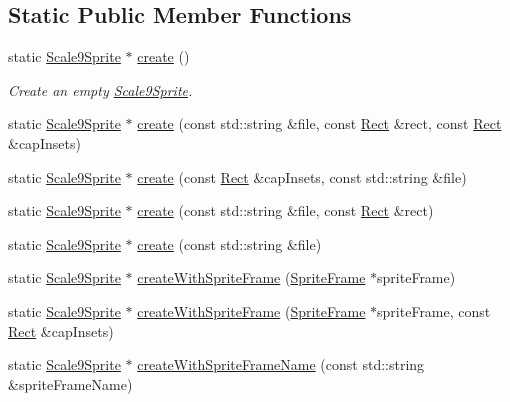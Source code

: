 \subsection*{Static Public Member Functions}
\begin{DoxyCompactItemize}
\item 
static \hyperlink{classui_1_1Scale9Sprite}{Scale9\+Sprite} $\ast$ \hyperlink{classui_1_1Scale9Sprite_abb087d61e6281ca484774a3dfc06d796}{create} ()
\begin{DoxyCompactList}\small\item\em Create an empty \hyperlink{classui_1_1Scale9Sprite}{Scale9\+Sprite}. \end{DoxyCompactList}\item 
static \hyperlink{classui_1_1Scale9Sprite}{Scale9\+Sprite} $\ast$ \hyperlink{classui_1_1Scale9Sprite_a5a5bad2e9dc0f1ef6a96470d96af9886}{create} (const std\+::string \&file, const \hyperlink{classRect}{Rect} \&rect, const \hyperlink{classRect}{Rect} \&cap\+Insets)
\item 
static \hyperlink{classui_1_1Scale9Sprite}{Scale9\+Sprite} $\ast$ \hyperlink{classui_1_1Scale9Sprite_a28938ce652673777ee1dd843b0c37ce9}{create} (const \hyperlink{classRect}{Rect} \&cap\+Insets, const std\+::string \&file)
\item 
static \hyperlink{classui_1_1Scale9Sprite}{Scale9\+Sprite} $\ast$ \hyperlink{classui_1_1Scale9Sprite_a0e57d4efd50b2df135a40e7d83de2f1a}{create} (const std\+::string \&file, const \hyperlink{classRect}{Rect} \&rect)
\item 
static \hyperlink{classui_1_1Scale9Sprite}{Scale9\+Sprite} $\ast$ \hyperlink{classui_1_1Scale9Sprite_ada47ed1da460627d81ec743cfdaefb6d}{create} (const std\+::string \&file)
\item 
static \hyperlink{classui_1_1Scale9Sprite}{Scale9\+Sprite} $\ast$ \hyperlink{classui_1_1Scale9Sprite_aa57483a53bca83bb2674262392d658c2}{create\+With\+Sprite\+Frame} (\hyperlink{classSpriteFrame}{Sprite\+Frame} $\ast$sprite\+Frame)
\item 
static \hyperlink{classui_1_1Scale9Sprite}{Scale9\+Sprite} $\ast$ \hyperlink{classui_1_1Scale9Sprite_a5b0809cd1de2816d5936fe7352af99e5}{create\+With\+Sprite\+Frame} (\hyperlink{classSpriteFrame}{Sprite\+Frame} $\ast$sprite\+Frame, const \hyperlink{classRect}{Rect} \&cap\+Insets)
\item 
static \hyperlink{classui_1_1Scale9Sprite}{Scale9\+Sprite} $\ast$ \hyperlink{classui_1_1Scale9Sprite_a0392b39e9e31cb2fe8d809039c83c50d}{create\+With\+Sprite\+Frame\+Name} (const std\+::string \&sprite\+Frame\+Name)

\end{DoxyCompactItemize}
